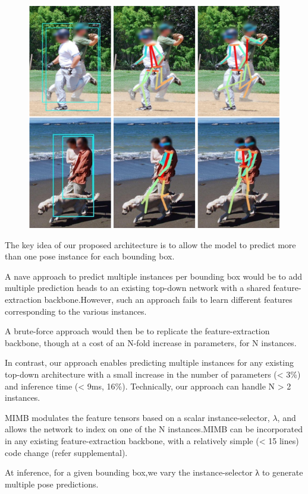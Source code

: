 \documentclass[11pt]{article}
\begin{document}
\begin{figure}[h]
	\centering
	\includegraphics[scale = 0.5]{47}
\end{figure}

The key idea of our proposed architecture is to allow the model to predict more than one pose instance for each bounding box.

A nave approach to predict multiple instances per bounding box would be to add multiple prediction heads to an existing top-down network with a shared feature-extraction backbone.However, such an approach fails to learn different features corresponding to the various instances. 

A brute-force approach would then be to replicate the feature-extraction backbone, though at a cost of an N-fold increase in parameters, for N instances.

In contrast, our approach enables predicting multiple instances for any existing top-down architecture with a small increase in the number of parameters (< 3\%) and inference time (< 9ms, 16\%). Technically, our approach can handle N > 2 instances.

MIMB modulates the feature tensors based on a scalar instance-selector, $\lambda$, and allows the network to index on one of the N instances.MIMB can be incorporated in any existing feature-extraction backbone, with a relatively simple (< 15 lines) code change (refer supplemental).

At inference, for a given bounding box,we vary the instance-selector λ to generate multiple pose predictions.
\end{document}
